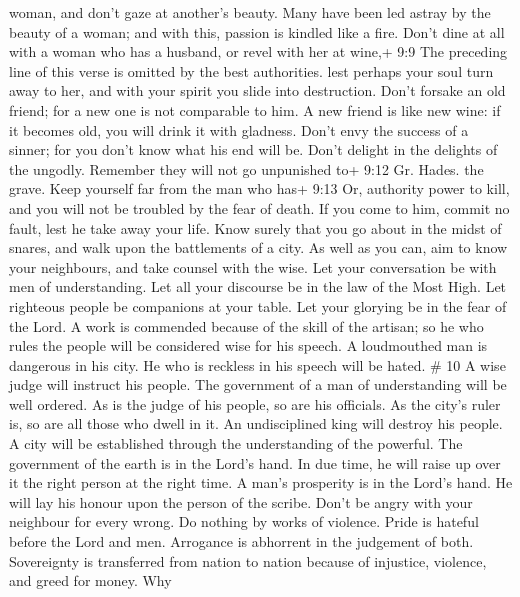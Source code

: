 woman, and don't gaze at another's beauty. Many have been led astray by
the beauty of a woman; and with this, passion is kindled like a fire.
 Don't dine at all with a woman who has a husband, or revel
with her at wine,+ 9:9 The preceding line of this verse is omitted by
the best authorities. lest perhaps your soul turn away to her, and with
your spirit you slide into destruction.  Don't forsake an
old friend; for a new one is not comparable to him. A new friend is like
new wine: if it becomes old, you will drink it with gladness.
 Don't envy the success of a sinner; for you don't know
what his end will be.  Don't delight in the delights of the
ungodly. Remember they will not go unpunished to+ 9:12 Gr. Hades. the
grave.  Keep yourself far from the man who has+ 9:13 Or,
authority power to kill, and you will not be troubled by the fear of
death. If you come to him, commit no fault, lest he take away your life.
Know surely that you go about in the midst of snares, and walk upon the
battlements of a city.  As well as you can, aim to know
your neighbours, and take counsel with the wise.  Let your
conversation be with men of understanding. Let all your discourse be in
the law of the Most High.  Let righteous people be
companions at your table. Let your glorying be in the fear of the Lord.
 A work is commended because of the skill of the artisan;
so he who rules the people will be considered wise for his speech.
 A loudmouthed man is dangerous in his city. He who is
reckless in his speech will be hated. \# 10  A wise judge
will instruct his people. The government of a man of understanding will
be well ordered.  As is the judge of his people, so are his
officials. As the city's ruler is, so are all those who dwell in it.
 An undisciplined king will destroy his people. A city will
be established through the understanding of the powerful. 
The government of the earth is in the Lord's hand. In due time, he will
raise up over it the right person at the right time.  A
man's prosperity is in the Lord's hand. He will lay his honour upon the
person of the scribe.  Don't be angry with your neighbour
for every wrong. Do nothing by works of violence.  Pride is
hateful before the Lord and men. Arrogance is abhorrent in the judgement
of both.  Sovereignty is transferred from nation to nation
because of injustice, violence, and greed for money.  Why
